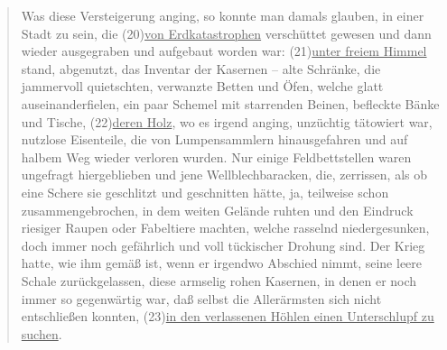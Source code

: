 \begin{nohyphens}
\begin{quote}
      Was diese Versteigerung anging, so konnte man damals glauben, in einer Stadt zu sein, die (20)\ul{von Erdkatastrophen} verschüttet gewesen und dann wieder ausgegraben und aufgebaut worden war: (21)\ul{unter freiem Himmel} stand, abgenutzt, das Inventar der Kasernen – alte Schränke, die jammervoll quietschten, verwanzte Betten und Öfen, welche glatt auseinanderfielen, ein paar Schemel mit starrenden Beinen, befleckte Bänke und Tische, (22)\ul{deren Holz}, wo es irgend anging, unzüchtig tätowiert war, nutzlose Eisenteile, die von Lumpensammlern hinausgefahren und auf halbem Weg wieder verloren wurden.
Nur einige Feldbettstellen waren ungefragt hiergeblieben und jene Wellblechbaracken, die, zerrissen, als ob eine Schere sie geschlitzt und geschnitten hätte, ja, teilweise schon zusammengebrochen, in dem weiten Gelände ruhten und den Eindruck riesiger Raupen oder Fabeltiere machten, welche rasselnd niedergesunken, doch immer noch gefährlich und voll tückischer Drohung sind.
Der Krieg hatte, wie ihm gemäß ist, wenn er irgendwo Abschied nimmt, seine leere Schale zurückgelassen, diese armselig rohen Kasernen, in denen er noch immer so gegenwärtig war, daß selbst die Allerärmsten sich nicht entschließen konnten, (23)\ul{in den verlassenen Höhlen einen Unterschlupf zu suchen}.
  \end{quote}
\end{nohyphens}


